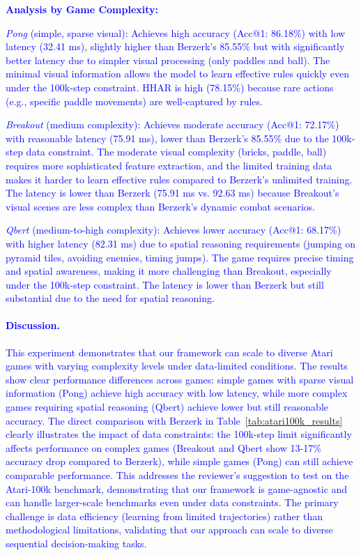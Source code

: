\documentclass{article} %
\newcommand{\revise}[1]{\textcolor{blue}{#1}}
\begin{document}
\revise{\textbf{Analysis by Game Complexity:}}

\revise{\textit{Pong} (simple, sparse visual): Achieves high accuracy (Acc@1: 86.18\%) with low latency (32.41 ms), slightly higher than Berzerk's 85.55\% but with significantly better latency due to simpler visual processing (only paddles and ball). The minimal visual information allows the model to learn effective rules quickly even under the 100k-step constraint. HHAR is high (78.15\%) because rare actions (e.g., specific paddle movements) are well-captured by rules.}

\revise{\textit{Breakout} (medium complexity): Achieves moderate accuracy (Acc@1: 72.17\%) with reasonable latency (75.91 ms), lower than Berzerk's 85.55\% due to the 100k-step data constraint. The moderate visual complexity (bricks, paddle, ball) requires more sophisticated feature extraction, and the limited training data makes it harder to learn effective rules compared to Berzerk's unlimited training. The latency is lower than Berzerk (75.91 ms vs. 92.63 ms) because Breakout's visual scenes are less complex than Berzerk's dynamic combat scenarios.}

\revise{\textit{Qbert} (medium-to-high complexity): Achieves lower accuracy (Acc@1: 68.17\%) with higher latency (82.31 ms) due to spatial reasoning requirements (jumping on pyramid tiles, avoiding enemies, timing jumps). The game requires precise timing and spatial awareness, making it more challenging than Breakout, especially under the 100k-step constraint. The latency is lower than Berzerk but still substantial due to the need for spatial reasoning.}
\revise{\paragraph{Discussion.}
This experiment demonstrates that our framework can scale to diverse Atari games with varying complexity levels under data-limited conditions. The results show clear performance differences across games: simple games with sparse visual information (Pong) achieve high accuracy with low latency, while more complex games requiring spatial reasoning (Qbert) achieve lower but still reasonable accuracy. The direct comparison with Berzerk in Table~\ref{tab:atari100k_results} clearly illustrates the impact of data constraints: the 100k-step limit significantly affects performance on complex games (Breakout and Qbert show 13-17\% accuracy drop compared to Berzerk), while simple games (Pong) can still achieve comparable performance. This addresses the reviewer's suggestion to test on the Atari-100k benchmark, demonstrating that our framework is game-agnostic and can handle larger-scale benchmarks even under data constraints. The primary challenge is data efficiency (learning from limited trajectories) rather than methodological limitations, validating that our approach can scale to diverse sequential decision-making tasks.}
\end{document}
